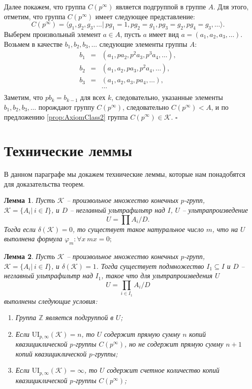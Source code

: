 \documentclass[a4paper,11pt,twoside]{article}
\newtheorem{lemma}{Лемма}[section]
\def\proof{{\noindent{\bf Доказательство.}} }
\def\K{{\mathcal{K}}}
\def\Z{{\mathbb{Z}}}
\def\ui{{\mathrm{UI}}}
\begin{document}
Далее покажем, что группа $C(p^\infty)$ является подгруппой в группе $A$. Для этого, отметим, что группа $C(p^\infty)$ имеет следующее представление:
$$C(p^\infty) = \langle g_1, g_2, g_3, \ldots | \ pg_1 = 1, pg_2 = g_1, pg_3 = g_2, pg_4 = g_3, \ldots \rangle.$$
Выберем произвольный элемент $a \in A$, пусть $a$ имеет вид $a = (a_1, a_2, a_3, \ldots )$. Возьмем в качестве $b_1, b_2, b_3, \ldots$ следующие элементы группы $A$:
$$\begin{array}{ccl}
b_1 & = & (a_1, pa_2, p^2a_3, p^3a_4, \ldots), \\
b_2 & = & (a_1, a_2, pa_3, p^2a_4, \ldots), \\
b_3 & = & (a_1, a_2, a_3, pa_4, \ldots), \\
&  & \ldots \\
\end{array}$$
Заметим, что $pb_k = b_{k-1}$ для всех $k$, следовательно, указанные элементы $b_1, b_2, b_3, \ldots$ порождают группу $C(p^\infty)$, следовательно $C(p^\infty) < A$, и по предложению \ref{prop:AxiomClass2} группа $C(p^\infty) \in \K$. $\square$ 


\section{Технические леммы}\label{sec:lemmas}

В данном параграфе мы докажем технические леммы, которые нам понадобятся для доказательства теорем. 


\begin{lemma}
Пусть $\K$ -- произвольное множество конечных $p$-групп, $\K = \{A_i | \ i \in I\}$, и $D$ -- неглавный ультрафильтр над $I$, $U$ -- ультрапроизведение 
$$U = \prod A_i \Big/ D.$$
Тогда если $\delta(\K) = 0$, то существует такое натуральное число $m$, что на $U$ выполнена формула $\varphi_m: \forall x \ mx = 0;$
\end{lemma}

\proof


\begin{lemma}\label{lemma:delta1UltraProduct}
Пусть $\K$ -- произвольное множество конечных $p$-групп, $\K = \{A_i | \ i \in I\}$, и $\delta(\K) = 1$. Тогда существует подмножество $I_1 \subseteq I$ и $D$ -- неглавный ультрафильтр над $I_1$, такое что для ультрапроизведения $U$
$$U = \prod_{i \in I_1} A_i \Big/ D$$
выполнены следующие условия:
\begin{enumerate}
\item Группа $\Z$ является подгруппой в $U$;
\item Если $\ui_{p,\infty}(\K) = n$, то $U$ содержит прямую сумму $n$ копий квазициклической $p$-группы $C(p^\infty)$, но не содержит прямую сумму $n+1$ копий квазициклической $p$-группы;
\item Если $\ui_{p,\infty}(\K) = \infty$, то $U$ содержит счетное количество копий квазициклической $p$-группы $C(p^\infty)$;
\end{enumerate}
\end{lemma}
\end{document}
